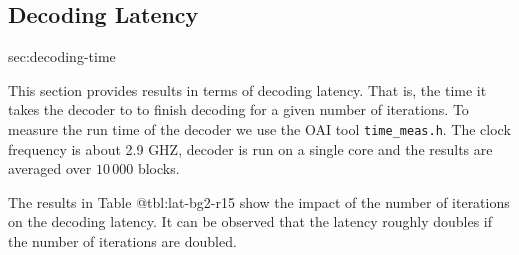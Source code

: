 \documentclass{article}
\begin{document}
\newpage
\subsection{Decoding Latency}{sec:decoding-time}

This section provides results in terms of decoding latency. That is, the time it takes the decoder to to finish decoding for a given number of iterations. To measure the run time of the decoder we use the OAI tool \texttt{time\_meas.h}. The clock frequency is about 2.9 GHZ, decoder is run on a single core and the results are averaged over $10\,000$ blocks.

The results in Table {@tbl:lat-bg2-r15} show the impact of the number of iterations on the decoding latency. It can be observed that the latency roughly doubles if the number of iterations are doubled.
\end{document}
